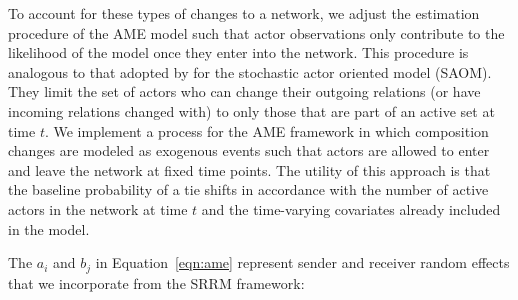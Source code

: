 To account for these types of changes to a network, we adjust the estimation procedure of the AME model such that actor observations only contribute to the likelihood of the model once they enter into the network. This procedure is analogous to that adopted by \citet{huisman:snijders:2003} for the stochastic actor oriented model (SAOM). They limit the set of actors who can change their outgoing relations (or have incoming relations changed with) to only those that are part of an active set at time $t$. We implement a process for the AME framework in which composition changes are modeled as exogenous events such that actors are allowed to enter and leave the network at fixed time points. The utility of this approach is that the baseline probability of a tie shifts in accordance with the number of active actors in the network at time $t$ and the time-varying covariates already included in the model.

The $a_{i}$ and $b_{j}$ in Equation~\ref{eqn:ame} represent sender and receiver random effects that we incorporate from the SRRM framework:

